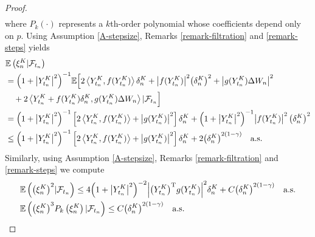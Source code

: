 \documentclass[preprint,12pt,compress]{elsarticle}
\begin{document}
\begin{proof}
\begin{equation}
\begin{split}
	\end{split}
	\end{equation}
	where $P_k(\cdot)$ represents a $k$th-order polynomial whose coefficients
	depend only on $p$. Using Assumption \ref{A-stepsize}, Remarks \ref{remark-filtration} and \ref{remark-steps} yields	
	\begin{equation*}
		\begin{split}  \label{xi1}
			&\mathbb{E}\left( {\xi _n^{K }|{{\cal F}_{{t_n}}}} \right) \\
			&= {\left( {1 + {{\left| {Y_{{t_n}}^K} \right|}^2}} \right)^{ - 1}}\mathbb{E}\Big[ {2\left\langle {Y_{{t_n}}^K,f(Y_{{t_n}}^K)} \right\rangle \delta _n^{K } + {{\left| {f(Y_{{t_n}}^K)} \right|}^2}{{\left( {\delta _n^{K }} \right)}^2} + {{\left| {g(Y_{{t_n}}^K)\Delta {W_n}} \right|}^2}}  \\
			&\quad + 2\left\langle {Y_{{t_n}}^K + f(Y_{{t_n}}^K){\delta _n^{K }},g(Y_{{t_n}}^K)\Delta {W_n}} \right\rangle |{\mathcal{F}_{{t_n}}} \Big] \\
			&= {\left( {1 + {{\left| {Y_{{t_n}}^K} \right|}^2}} \right)^{ - 1}}\left[ {2\left\langle {Y_{{t_n}}^K,f(Y_{{t_n}}^K)} \right\rangle  + {{\left| {g(Y_{{t_n}}^K)} \right|}^2}} \right]{\delta _n^{K }} + {\left( {1 + {{\left| {Y_{{t_n}}^K} \right|}^2}} \right)^{ - 1}}{\left| {f(Y_{{t_n}}^K)} \right|^2}\left( {\delta _n^{K }} \right)^2 \\
			&\le {\left( {1 + {{\left| {Y_{{t_n}}^K} \right|}^2}} \right)^{ - 1}}\left[ {2\left\langle {Y_{{t_n}}^K,f(Y_{{t_n}}^K)} \right\rangle  + {{\left| {g(Y_{{t_n}}^K)} \right|}^2}} \right]{\delta _n^{K }} + 2{\left( {\delta _n^{K }} \right)^{2(1 - \gamma )}} \quad \text{a.s.}
		\end{split}
	\end{equation*}
Similarly, using Assumption \ref{A-stepsize}, Remarks \ref{remark-filtration} and \ref{remark-steps}
we compute 
\begin{equation*}
\begin{split}
	&\mathbb{E}\left( {{{\left( {\xi _n^{K }} \right)}^2}|{\mathcal{F}_{{t_n}}}} \right) \le 4{\left( {1 + {{\left| {Y_{{t_n}}^K} \right|}^2}} \right)^{ - 2}}{\left| {{{\left( {Y_{{t_n}}^K} \right)}^{\rm T}}g(Y_{{t_n}}^K)} \right|^2}\delta _n^K + C{\left( {\delta _n^{K }} \right)^{2(1 - \gamma )}}  \quad \text{a.s.} \\
	&\mathbb{E}\left( {{{\left( {\xi _n^K} \right)}^3}{P_k}\left( {\xi _n^K} \right)|{\mathcal{F}_{{t_n}}}} \right) \le {C}{\left( {\delta _n^K} \right)^{2(1 - \gamma )}} \quad  \text{a.s.}
\end{split}

\end{equation*}
\end{proof}
\end{document}
